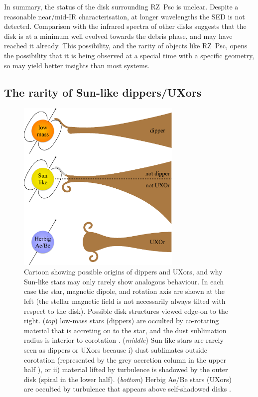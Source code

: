 \documentclass[]{rsos}
\begin{document}
In summary, the status of the disk surrounding RZ~Psc is unclear. Despite a reasonable
near/mid-IR characterisation, at longer wavelengths the SED is not detected. Comparison
with the infrared spectra of other disks suggests that the disk is at a minimum well
evolved towards the debris phase, and may have reached it already. This possibility, and
the rarity of objects like RZ~Psc, opens the possibility that it is being observed at a
special time with a specific geometry, so may yield better insights than most systems.

\subsection{The rarity of Sun-like dippers/UXors}\label{ss:rarity}

\begin{figure}
  \begin{center}
    \hspace{-0.5cm} \includegraphics[width=0.7\textwidth]{figs/cartoon-crop.ps}
    \caption{Cartoon showing possible origins of dippers and UXors, and why Sun-like
      stars may only rarely show analogous behaviour. In each case the star, magnetic
      dipole, and rotation axis are shown at the left (the stellar magnetic field is not
      necessarily always tilted with respect to the disk). Possible disk structures
      viewed edge-on to the right. (\emph{top}) low-mass stars (dippers) are occulted by
      co-rotating material that is accreting on to the star, and the dust sublimation
      radius is interior to corotation \cite{2016arXiv160503985B}. (\emph{middle})
      Sun-like stars are rarely seen as dippers or UXors because i) dust sublimates
      outside corotation (represented by the grey accretion column in the upper half
      \cite{2016arXiv160503985B}), or ii) material lifted by turbulence is shadowed by
      the outer disk (spiral in the lower half). (\emph{bottom}) Herbig Ae/Be stars
      (UXors) are occulted by turbulence that appears above self-shadowed disks
      \cite{2003ApJ...594L..47D}.}\label{fig:cartoon}
  \end{center}
\end{figure}
\end{document}
